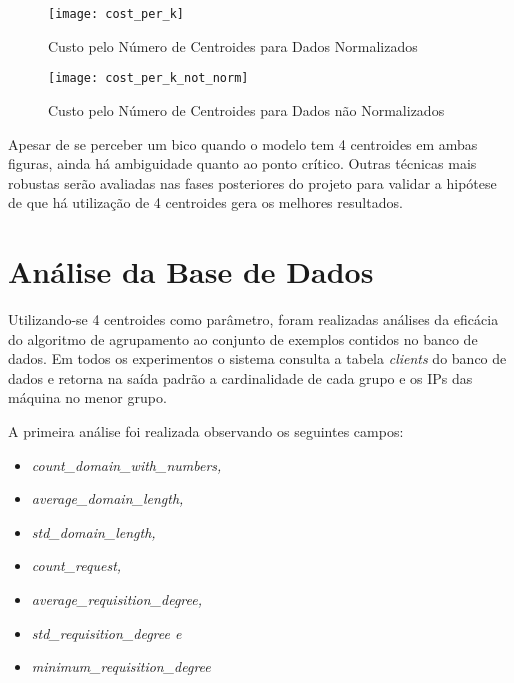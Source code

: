
\begin{figure}[htbp]
\centering
\texttt{[image: cost\_per\_k]}
\caption[Custo pelo Número de Centroides para Dados Normalizados]{Custo pelo Número de Centroides para Dados Normalizados} \label{fig:cost_per_k}
\end{figure}

\begin{figure}[htbp]
\centering
\texttt{[image: cost\_per\_k\_not\_norm]}
\caption[Custo pelo Número de Centroides para Dados não Normalizados]{Custo pelo Número de Centroides para Dados não Normalizados} \label{fig:cost_per_k_not_norm}
\end{figure}

Apesar de se perceber um bico quando o modelo tem 4 centroides em ambas figuras, ainda há ambiguidade quanto ao ponto crítico. Outras técnicas mais robustas serão avaliadas nas fases posteriores do projeto para validar a hipótese de que há utilização de 4 centroides gera os melhores resultados.

\section{Análise da Base de Dados}

Utilizando-se 4 centroides como parâmetro, foram realizadas análises da eficácia do algoritmo de agrupamento ao conjunto de exemplos contidos no banco de dados. Em todos os experimentos o sistema consulta a tabela \textit{clients} do banco de dados e retorna na saída padrão a cardinalidade de cada grupo e os IPs das máquina no menor grupo.

A primeira análise foi realizada observando os seguintes campos:

\begin{itemize}
\item \textit{count\_domain\_with\_numbers, }
\item \textit{average\_domain\_length, }
\item \textit{std\_domain\_length, }
\item \textit{count\_request, }
\item \textit{average\_requisition\_degree, }
\item \textit{std\_requisition\_degree e }
\item \textit{minimum\_requisition\_degree }
\end{itemize}

